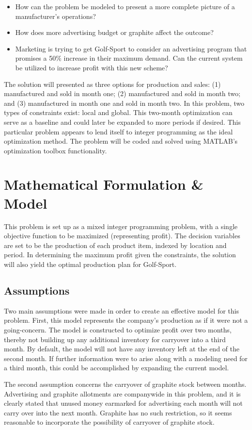 \documentclass{article}
\begin{document}
\begin{itemize}
	\item How can the problem be modeled to present a more complete picture of a manufacturer’s operations?
	\item How does more advertising budget or graphite affect the outcome?
	\item Marketing is trying to get Golf-Sport to consider an advertising program that promises a 50\% increase in their maximum demand. Can the current system be utilized to increase profit with this new scheme?
\end{itemize}
\par
The solution will presented as three options for production and sales: (1) manufactured and sold in month one; (2) manufactured and sold in month two; and (3) manufactured in month one and sold in month two. In this problem, two types of constraints exist: local and global. This two-month optimization can serve as a baseline and could later be expanded to more periods if desired. This particular problem appears to lend itself to integer programming as the ideal optimization method. The problem will be coded and solved using MATLAB’s optimization toolbox functionality.
\section{Mathematical Formulation \& Model}
This problem is set up as a mixed integer programming problem, with a single objective function to be maximized (representing profit).  
The decision variables are set to be the production of each product item, indexed by location and period.  In determining the maximum profit given the constraints, 
the solution will also yield the optimal production plan for Golf-Sport.
\subsection{Assumptions}
Two main assumptions were made in order to create an effective model for this problem.  First, this model represents the company's production as if it were not a 
going-concern.  The model is constructed to optimize profit over two months, thereby not building up any additional inventory for carryover into 
a third month.  By default, the model will not have any inventory left at the end of the second month.  If further information were to arise along with 
a modeling need for a third month, this could be accomplished by expanding the current model.
\par
The second assumption concerns the carryover of graphite stock between months.  Advertising and graphite allotments are companywide in this problem, and 
it is clearly stated that unused money earmarked for advertising each month will not carry over into the next month.  Graphite has no such restriction, so 
it seems reasonable to incorporate the possibility of carryover of graphite stock.
\end{document}
